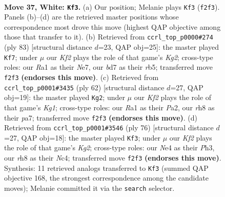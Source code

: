 \documentclass[11pt]{article}
\begin{document}
\clearpage

\begin{figure}[p]\centering
\begin{subfigure}{0.46\textwidth}\centering
\resizebox{\linewidth}{!}{%
\newchessgame
\chessboard[
  setfen={7r/3bk3/1p6/p3p3/P3N3/1P4P1/5K2/R7 w - - 4 37},
  showmover=false,
  pgfstyle=straightmove, color=movearrow, markmove={f2-f3}
]}
\caption{}
\end{subfigure}\hfill
\begin{subfigure}{0.46\textwidth}\centering
\resizebox{\linewidth}{!}{%
\newchessgame
\chessboard[
  setfen={8/4n1k1/4p1p1/1R1p4/6PP/p1b5/B5K1/8 b - - 0 42},
  showmover=false,
  pgfstyle=straightmove, color=movearrow, markmove={g7-f7}
]}
\caption{}
\end{subfigure}
\\[4pt]
\begin{subfigure}{0.46\textwidth}\centering
\resizebox{\linewidth}{!}{%
\newchessgame
\chessboard[
  setfen={6k1/p1br4/6pp/8/8/5NP1/P4P1P/1R4K1 w - - 2 32},
  showmover=false,
  pgfstyle=straightmove, color=movearrow, markmove={g1-g2}
]}
\caption{}
\end{subfigure}\hfill
\begin{subfigure}{0.46\textwidth}\centering
\resizebox{\linewidth}{!}{%
\newchessgame
\chessboard[
  setfen={8/2b1k1p1/4p3/5p1p/2N5/4P1PP/5PK1/8 w - - 0 39},
  showmover=false,
  pgfstyle=straightmove, color=movearrow, markmove={g2-f3}
]}
\caption{}
\end{subfigure}
\caption{\textbf{Move 37, White: \texttt{Kf3}.} (a) Our position; Melanie plays \texttt{Kf3} (\texttt{f2f3}). Panels (b)--(d) are the retrieved master positions whose correspondence most drove this move (highest QAP objective among those that transfer to it). (b) Retrieved from \texttt{ccrl\_top\_p0000\#274} (ply 83) [structural distance $d$=23, QAP obj=25]: the master played \texttt{Kf7}; under $\mu$ our \emph{Kf2} plays the role of that game's \emph{Kg2}; cross-type roles: our \emph{R}a1 as their \emph{N}e7, our \emph{b}d7 as their \emph{r}b5; transferred move \texttt{f2f3} \textbf{(endorses this move)}. (c) Retrieved from \texttt{ccrl\_top\_p0001\#3435} (ply 62) [structural distance $d$=27, QAP obj=19]: the master played \texttt{Kg2}; under $\mu$ our \emph{Kf2} plays the role of that game's \emph{Kg1}; cross-type roles: our \emph{R}a1 as their \emph{P}a2, our \emph{r}h8 as their \emph{p}a7; transferred move \texttt{f2f3} \textbf{(endorses this move)}. (d) Retrieved from \texttt{ccrl\_top\_p0001\#3546} (ply 76) [structural distance $d$=27, QAP obj=18]: the master played \texttt{Kf3}; under $\mu$ our \emph{Kf2} plays the role of that game's \emph{Kg2}; cross-type roles: our \emph{N}e4 as their \emph{P}h3, our \emph{r}h8 as their \emph{N}c4; transferred move \texttt{f2f3} \textbf{(endorses this move)}. Synthesis: 11 retrieved analogs transferred to \texttt{Kf3} (summed QAP objective 168, the strongest correspondence among the candidate moves); Melanie committed it via the \texttt{search} selector.}
\label{fig:thought-m72}
\end{figure}
\end{document}
